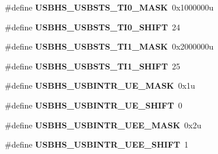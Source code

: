 \begin{DoxyCompactItemize}
\item 
\hypertarget{group___u_s_b_h_s___register___masks_ga2bb4d45c16a8343bc7e54826de99b467}{}\#define {\bfseries U\+S\+B\+H\+S\+\_\+\+U\+S\+B\+S\+T\+S\+\_\+\+T\+I0\+\_\+\+M\+A\+S\+K}~0x1000000u\label{group___u_s_b_h_s___register___masks_ga2bb4d45c16a8343bc7e54826de99b467}

\item 
\hypertarget{group___u_s_b_h_s___register___masks_ga857f519f56cb3e0d4923ab2030e0b7d3}{}\#define {\bfseries U\+S\+B\+H\+S\+\_\+\+U\+S\+B\+S\+T\+S\+\_\+\+T\+I0\+\_\+\+S\+H\+I\+F\+T}~24\label{group___u_s_b_h_s___register___masks_ga857f519f56cb3e0d4923ab2030e0b7d3}

\item 
\hypertarget{group___u_s_b_h_s___register___masks_gaa772a243a352c38131b67dbc518a2e85}{}\#define {\bfseries U\+S\+B\+H\+S\+\_\+\+U\+S\+B\+S\+T\+S\+\_\+\+T\+I1\+\_\+\+M\+A\+S\+K}~0x2000000u\label{group___u_s_b_h_s___register___masks_gaa772a243a352c38131b67dbc518a2e85}

\item 
\hypertarget{group___u_s_b_h_s___register___masks_ga95c1f814c5200efd75b0f100a4139f39}{}\#define {\bfseries U\+S\+B\+H\+S\+\_\+\+U\+S\+B\+S\+T\+S\+\_\+\+T\+I1\+\_\+\+S\+H\+I\+F\+T}~25\label{group___u_s_b_h_s___register___masks_ga95c1f814c5200efd75b0f100a4139f39}

\item 
\hypertarget{group___u_s_b_h_s___register___masks_ga3b2186546f6878167f675134a8541a4c}{}\#define {\bfseries U\+S\+B\+H\+S\+\_\+\+U\+S\+B\+I\+N\+T\+R\+\_\+\+U\+E\+\_\+\+M\+A\+S\+K}~0x1u\label{group___u_s_b_h_s___register___masks_ga3b2186546f6878167f675134a8541a4c}

\item 
\hypertarget{group___u_s_b_h_s___register___masks_gab852d8695f93830607970ff3d6c7e425}{}\#define {\bfseries U\+S\+B\+H\+S\+\_\+\+U\+S\+B\+I\+N\+T\+R\+\_\+\+U\+E\+\_\+\+S\+H\+I\+F\+T}~0\label{group___u_s_b_h_s___register___masks_gab852d8695f93830607970ff3d6c7e425}

\item 
\hypertarget{group___u_s_b_h_s___register___masks_gae02f70c5c09f26cc20a813b060d4bf1f}{}\#define {\bfseries U\+S\+B\+H\+S\+\_\+\+U\+S\+B\+I\+N\+T\+R\+\_\+\+U\+E\+E\+\_\+\+M\+A\+S\+K}~0x2u\label{group___u_s_b_h_s___register___masks_gae02f70c5c09f26cc20a813b060d4bf1f}

\item 
\hypertarget{group___u_s_b_h_s___register___masks_ga567ca6f4a0602b862e221404bdcb2f21}{}\#define {\bfseries U\+S\+B\+H\+S\+\_\+\+U\+S\+B\+I\+N\+T\+R\+\_\+\+U\+E\+E\+\_\+\+S\+H\+I\+F\+T}~1\label{group___u_s_b_h_s___register___masks_ga567ca6f4a0602b862e221404bdcb2f21}


\end{DoxyCompactItemize}
